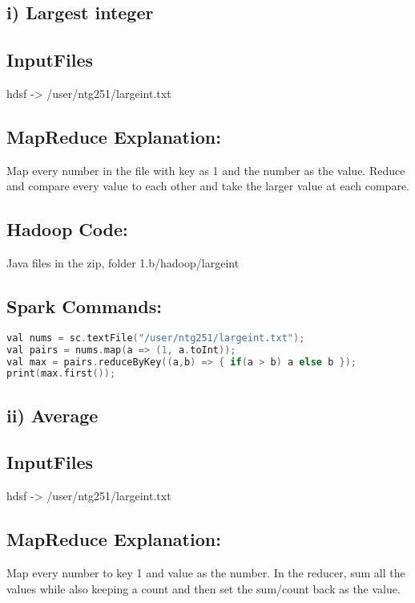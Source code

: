 \section*{}
\subsection*{i) Largest integer}
\subsection*{InputFiles}
hdsf -> /user/ntg251/largeint.txt

\subsection*{MapReduce Explanation:}
Map every number in the file with key as 1 and the number as the value. Reduce and compare every value to each other and take the larger value at each compare.

\subsection*{Hadoop Code:}
Java files in the zip, folder 1.b/hadoop/largeint

\subsection*{Spark Commands:}
\begin{lstlisting}[language=c++]
val nums = sc.textFile("/user/ntg251/largeint.txt");
val pairs = nums.map(a => (1, a.toInt));
val max = pairs.reduceByKey((a,b) => { if(a > b) a else b });
print(max.first());
\end{lstlisting}

\subsection*{ii) Average}
\subsection*{InputFiles}
hdsf -> /user/ntg251/largeint.txt

\subsection*{MapReduce Explanation:}
Map every number to key 1 and value as the number. In the reducer, sum all the values while also keeping a count and then set the sum/count back as the value.

